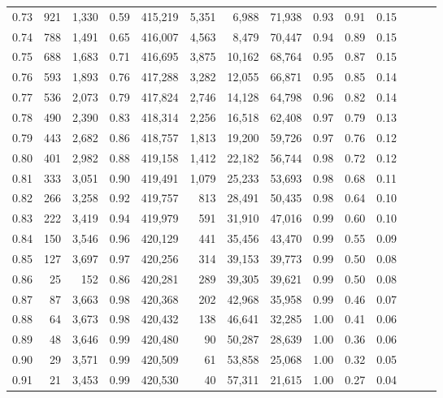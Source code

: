 \begin{tabular}{rrrrrrrrrrrrrr}
0.73 &    921 &  1,330 &  0.59 &  415,219 &    5,351 &   6,988 &  71,938 &  0.93 &  0.91 &      0.15 \\
0.74 &    788 &  1,491 &  0.65 &  416,007 &    4,563 &   8,479 &  70,447 &  0.94 &  0.89 &      0.15 \\
0.75 &    688 &  1,683 &  0.71 &  416,695 &    3,875 &  10,162 &  68,764 &  0.95 &  0.87 &      0.15 \\
0.76 &    593 &  1,893 &  0.76 &  417,288 &    3,282 &  12,055 &  66,871 &  0.95 &  0.85 &      0.14 \\
0.77 &    536 &  2,073 &  0.79 &  417,824 &    2,746 &  14,128 &  64,798 &  0.96 &  0.82 &      0.14 \\
0.78 &    490 &  2,390 &  0.83 &  418,314 &    2,256 &  16,518 &  62,408 &  0.97 &  0.79 &      0.13 \\
0.79 &    443 &  2,682 &  0.86 &  418,757 &    1,813 &  19,200 &  59,726 &  0.97 &  0.76 &      0.12 \\
0.80 &    401 &  2,982 &  0.88 &  419,158 &    1,412 &  22,182 &  56,744 &  0.98 &  0.72 &      0.12 \\
0.81 &    333 &  3,051 &  0.90 &  419,491 &    1,079 &  25,233 &  53,693 &  0.98 &  0.68 &      0.11 \\
0.82 &    266 &  3,258 &  0.92 &  419,757 &      813 &  28,491 &  50,435 &  0.98 &  0.64 &      0.10 \\
0.83 &    222 &  3,419 &  0.94 &  419,979 &      591 &  31,910 &  47,016 &  0.99 &  0.60 &      0.10 \\
0.84 &    150 &  3,546 &  0.96 &  420,129 &      441 &  35,456 &  43,470 &  0.99 &  0.55 &      0.09 \\
0.85 &    127 &  3,697 &  0.97 &  420,256 &      314 &  39,153 &  39,773 &  0.99 &  0.50 &      0.08 \\
0.86 &     25 &    152 &  0.86 &  420,281 &      289 &  39,305 &  39,621 &  0.99 &  0.50 &      0.08 \\
0.87 &     87 &  3,663 &  0.98 &  420,368 &      202 &  42,968 &  35,958 &  0.99 &  0.46 &      0.07 \\
0.88 &     64 &  3,673 &  0.98 &  420,432 &      138 &  46,641 &  32,285 &  1.00 &  0.41 &      0.06 \\
0.89 &     48 &  3,646 &  0.99 &  420,480 &       90 &  50,287 &  28,639 &  1.00 &  0.36 &      0.06 \\
0.90 &     29 &  3,571 &  0.99 &  420,509 &       61 &  53,858 &  25,068 &  1.00 &  0.32 &      0.05 \\
0.91 &     21 &  3,453 &  0.99 &  420,530 &       40 &  57,311 &  21,615 &  1.00 &  0.27 &      0.04 \\

\end{tabular}
